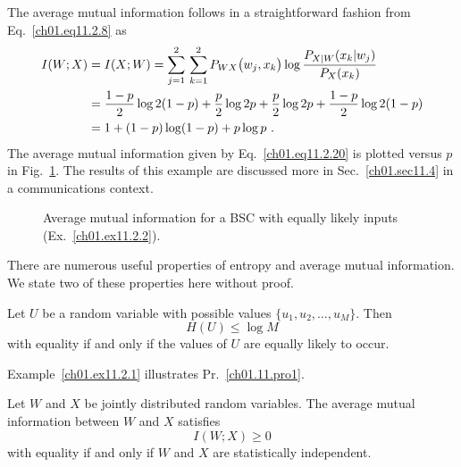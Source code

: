 \begin{example}
The average mutual information follows in a straightforward fashion from
Eq.~\eqref{ch01.eq11.2.8} as
\begin{align}
 I(W;X) \displaystyle & = I(X;W) = \sum^2_{j=1}\, \sum^2_{k=1}
  P_{WX}\big(w_j, x_k\big)  \log
  \frac{P_{X|W}(x_k|w_j)}{ P_X(x_k) }
\notag\\
 \displaystyle & = \frac{1-p}{2} \log 2(1-p)+ \frac{p}{2}
 \log 2p + \frac{p}{2} \log 2p +\frac{1-p}{2} \log 2 (1-p)
\notag\\
 \displaystyle & = 1 + (1-p) \log (1-p) + p \log p~.
\label{ch01.eq11.2.20}
\end{align}
The average mutual information given by Eq.~\eqref{ch01.eq11.2.20}
is plotted versus  %
$p$  in Fig.~\ref{ch01.fig11.2.1}. The results of this example are discussed
more in Sec.~\ref{ch01.sec11.4} in a communications context.
\end{example}

\begin{figure}[hbt] %
 \figboxes
\caption{Average mutual information for a BSC with equally likely
         inputs (Ex.~\protect\ref{ch01.ex11.2.2}).
\label{ch01.fig11.2.1} }
\end{figure}

There are numerous useful properties of entropy and average mutual information.
We state two of these properties here without proof.

\begin{property}
\label{ch01.11.pro1}
Let $U$ be a random variable with possible values $\{u_1,u_2,\dots, u_M\}$.
Then
\begin{equation}
 H(U) \leq \log M
\label{ch01.eq11.2.21}
\end{equation}
with equality if and only if the values of $U$
are equally likely to occur.
\end{property}

Example~\ref{ch01.ex11.2.1} illustrates Pr.~\ref{ch01.11.pro1}.

\begin{property}
\label{ch01.11.pro2}
Let $W$ and $X$ be jointly distributed random variables.
The average mutual information between $W$ and $X$ satisfies
\begin{equation}
  I(W;X) \geq 0
\label{ch01.eq11.2.22}
\end{equation}
with equality if and only if $W$ and $X$ are statistically independent.
\end{property}


